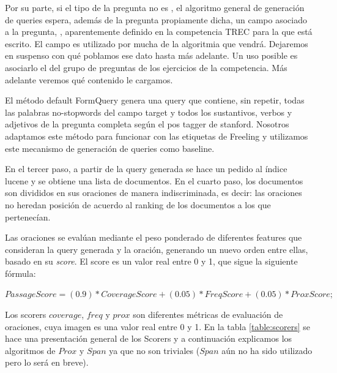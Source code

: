 Por su parte, si el tipo de la pregunta no es , el algoritmo general de generación de queries espera, además de la pregunta propiamente dicha, un campo asociado a la pregunta, , aparentemente definido en la competencia TREC para la que está escrito. El campo  es utilizado por mucha de la algoritmia que vendrá. Dejaremos en suspenso con qué poblamos ese dato hasta más adelante. Un uso posible es asociarlo el  del grupo de preguntas de los ejercicios de la competencia. Más adelante veremos qué contenido le cargamos.


El método default FormQuery genera una query que contiene, sin repetir, todas las palabras no-stopwords del campo target y todos los sustantivos, verbos y adjetivos de la pregunta completa según el pos tagger de stanford. Nosotros adaptamos este método para funcionar con las etiquetas de Freeling y utilizamos este mecanismo de generación de queries como baseline.

En el tercer paso, a partir de la query generada se hace un pedido al índice lucene y se obtiene una lista de documentos. En el cuarto paso, los documentos son divididos en sus oraciones de manera indiscriminada, es decir: las oraciones no heredan posición de acuerdo al ranking de los documentos a los que pertenecían.

Las oraciones se evalúan mediante el peso ponderado de diferentes features que consideran la query generada y la oración, generando un nuevo orden entre ellas, basado en su \textit{score}. El score es un valor real entre 0 y 1, que sigue la siguiente fórmula:

\medskip

$PassageScore = (0.9)*CoverageScore + (0.05)*FreqScore+ (0.05)*ProxScore;$

\medskip
Los scorers $coverage$, $freq$ y $prox$ son diferentes métricas de evaluación de oraciones, cuya imagen es una valor real entre 0 y 1. En la tabla \ref{table:scorers} se hace una presentación general de los Scorers y a continuación explicamos los algoritmos de $Prox$ y $Span$ ya que no son triviales ($Span$ aún no ha sido utilizado pero lo será en breve).

